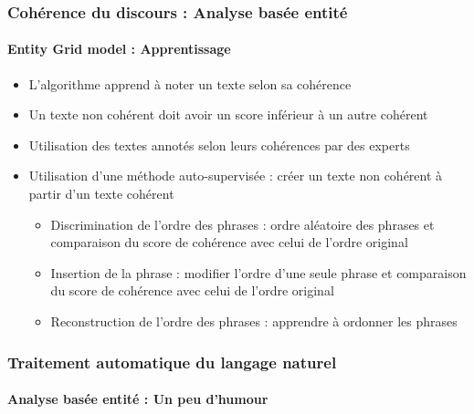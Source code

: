 \documentclass[xcolor=table]{beamer}
\begin{document}
\begin{frame}
	\frametitle{Cohérence du discours : Analyse basée entité}
	\framesubtitle{Entity Grid model : Apprentissage}
	
	\begin{itemize}
		\item L'algorithme apprend à noter un texte selon sa cohérence
		\item Un texte non cohérent doit avoir un score inférieur à un autre cohérent
		\item Utilisation des textes annotés selon leurs cohérences par des experts
		\item Utilisation d'une méthode auto-supervisée : créer un texte non cohérent à partir d'un texte cohérent
		\begin{itemize}
			\item Discrimination de l'ordre des phrases : ordre aléatoire des phrases et comparaison du score de cohérence avec celui de l'ordre original
			\item Insertion de la phrase : modifier l'ordre d'une seule phrase et comparaison du score de cohérence avec celui de l'ordre original
			\item Reconstruction de l'ordre des phrases : apprendre à ordonner les phrases
		\end{itemize}
	\end{itemize}
	
\end{frame}

\begin{frame}
	\frametitle{Traitement automatique du langage naturel}
	\framesubtitle{Analyse basée entité :  Un peu d'humour}
	
	\begin{center}
	\end{center}
	
\end{frame}


\end{document}

